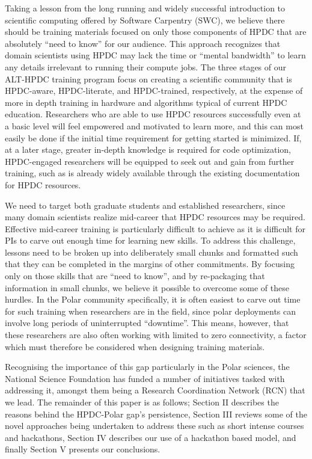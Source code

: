 \documentclass[conference]{IEEEtran}
\begin{document}
Taking a lesson from the long running and widely successful introduction to scientific computing offered by Software Carpentry (SWC)\cite{Wilson2014-pc}, we believe there should be training materials focused on only those components of HPDC that are absolutely ``need to know'' for our audience. This approach recognizes that domain scientists using HPDC may lack the time or ``mental bandwidth'' to learn any details irrelevant to running their compute jobs. The three stages of our ALT-HPDC training program focus on creating a scientific community that is HPDC-aware, HPDC-literate, and HPDC-trained, respectively, at the expense of more in depth training in hardware and algorithms typical of current HPDC education.  Researchers who are able to use HPDC resources successfully even at a basic level will feel empowered and motivated to learn more, and this can most easily be done if the initial time requirement for getting started is minimized. If, at a later stage, greater in-depth knowledge is required for code optimization, HPDC-engaged researchers will be equipped to seek out and gain from further training, such as is already widely available through the existing documentation for HPDC resources.

We need to target both graduate students and established researchers, since many domain scientists realize mid-career that HPDC resources may be required. Effective mid-career training is particularly difficult to achieve as it is difficult for PIs to carve out enough time for learning new skills. To address this challenge, lessons need to be broken up into deliberately small chunks and formatted such that they can be completed in the margins of other commitments. By focusing only on those skills that are ``need to know'', and by re-packaging that information in small chunks, we believe it possible to overcome some of these hurdles.  In the Polar community specifically, it is often easiest to carve out time for such training when researchers are in the field, since polar deployments can involve long periods of uninterrupted ``downtime''.  This means, however, that these researchers are also often working with limited to zero connectivity, a factor which must therefore be considered when designing training materials.

Recognising the importance of this gap particularly in the Polar sciences, the National Science Foundation has funded a number of initiatives tasked with addressing it, amongst them being a Research Coordination Network (RCN) that we lead. The remainder of this paper is as follows; Section II describes the reasons behind the HPDC-Polar gap’s persistence, Section III reviews some of the novel approaches being undertaken to address these such as short intense courses and hackathons, Section IV describes our use of a hackathon based model, and finally Section V presents our conclusions.
\end{document}
